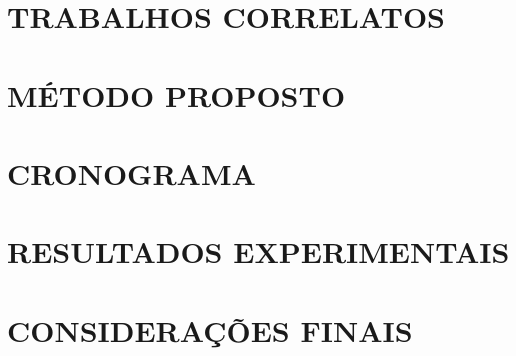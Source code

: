 \documentclass[
	12pt,				%
    oneside,			%
	a4paper,			%
	chapter=TITLE,		%
	english,			%
	brazil				%
	]{abntex2}
\begin{document}
\chapter{TRABALHOS CORRELATOS}



\chapter{MÉTODO PROPOSTO}


\chapter{CRONOGRAMA}


\chapter{RESULTADOS EXPERIMENTAIS}


\chapter{CONSIDERAÇÕES FINAIS}



\end{document}
